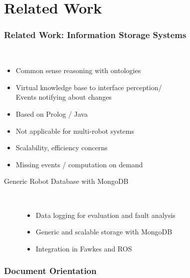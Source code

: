 \section{Related Work}
\begin{frame}
  \frametitle{Related Work: Information Storage Systems}
  \begin{description}[]
  \item[KnowRob/OpenRobots Ontology (ORO)]<uncover@1-> \hfill \\
    \begin{itemize}
    \item Common sense reasoning with ontologies
    \item Virtual knowledge base to interface perception/\\
          Events notifying about changes
    \item Based on Prolog / Java
    \end{itemize}
  \end{description}
  \begin{block}{}%
  \begin{itemize}
  \item Not applicable for multi-robot systems
  \item Scalability, efficiency concerns %
  \item Missing events / computation on demand
  \end{itemize}
  \end{block}
  \begin{description}
  \item[Generic Robot Database with MongoDB]%
                \hfill \\
    \begin{itemize}
    \item Data logging for evaluation and fault analysis
    \item Generic and scalable storage with MongoDB
    \item Integration in Fawkes and ROS
    \end{itemize}
  \end{description}
\end{frame}

\begin{frame}
  \frametitle{Document Orientation}
\end{frame}

